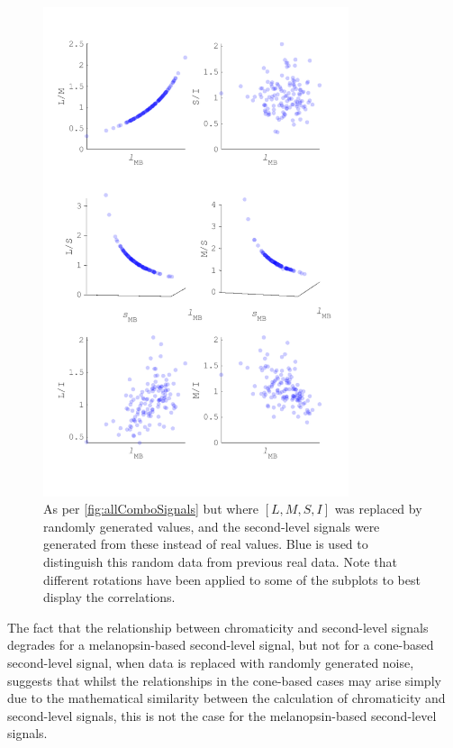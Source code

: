 \begin{figure}
\includegraphics[max width=0.8\textwidth]{figs/comp/predictingChromaticity/allComboSignals_rand.pdf} 
\caption{As per \ref{fig:allComboSignals} but where $[L,M,S,I]$ was replaced by randomly generated values, and the second-level signals were generated from these instead of real values. Blue is used to distinguish this random data from previous real data. Note that different rotations have been applied to some of the subplots to best display the correlations.}
\label{fig:allComboSignals_rand}
\end{figure}

The fact that the relationship between chromaticity and second-level signals degrades for a melanopsin-based second-level signal, but not for a cone-based second-level signal, when data is replaced with randomly generated noise, suggests that whilst the relationships in the cone-based cases may arise simply due to the mathematical similarity between the calculation of chromaticity and second-level signals, this is not the case for the melanopsin-based second-level signals. 

